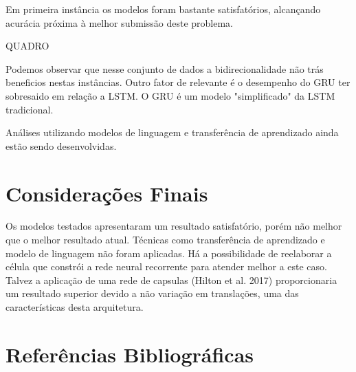 \documentclass[12pt]{article}
\begin{document}
Em primeira instância os modelos foram bastante satisfatórios, alcançando acurácia próxima à melhor submissão deste problema.

QUADRO

Podemos observar que nesse conjunto de dados a bidirecionalidade não trás beneficios nestas instâncias. Outro fator de relevante é o desempenho do GRU ter sobresaido em relação a LSTM. O GRU é um modelo "simplificado" da LSTM tradicional.

Análises utilizando modelos de linguagem e transferência de aprendizado ainda estão sendo desenvolvidas.

\section{Considerações Finais}

Os modelos testados apresentaram um resultado satisfatório, porém não melhor que o melhor resultado atual. Técnicas como transferência de aprendizado e modelo de linguagem não foram aplicadas. Há a possibilidade de reelaborar a célula que constrói a rede neural recorrente para atender melhor a este caso. Talvez a aplicação de uma rede de capsulas (Hilton et al. 2017) proporcionaria um resultado superior devido a não variação em translações, uma das características desta arquitetura. 

\section{Referências Bibliográficas}



\end{document}
